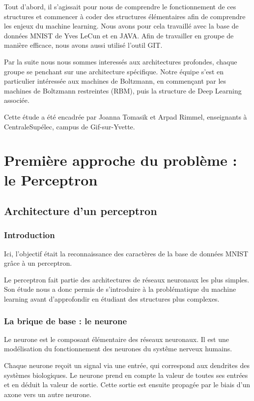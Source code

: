 \documentclass[a4paper,twoside]{report}
\begin{document}
			Tout d'abord, il s'agissait pour nous de comprendre le fonctionnement de ces structures et commencer à coder des structures élémentaires afin de comprendre les enjeux du machine learning. Nous avons pour cela travaillé avec la base de données MNIST de Yves LeCun et en JAVA. Afin de travailler en groupe de manière efficace, nous avons aussi utilisé l'outil GIT.

			Par la suite nous nous sommes interessés aux architectures profondes, chaque groupe se penchant sur une architecture spécifique. Notre équipe s'est en particulier intéressée aux machines de Boltzmann, en commençant par les machines de Boltzmann restreintes (RBM), puis la structure de Deep Learning associée.

			Cette étude a été encadrée par Joanna Tomasik et Arpad Rimmel, enseignants à CentraleSupélec, campus de Gif-sur-Yvette.



	\part[Le Perceptron]{Première approche du problème : le Perceptron}


		\chapter{Architecture d'un perceptron}

			\section{Introduction}

				Ici, l'objectif était la reconnaissance des caractères de la base de données MNIST grâce à un perceptron.

				Le perceptron fait partie des architectures de réseaux neuronaux les plus simples. Son étude nous a donc permis de s'introduire à la problématique du machine learning avant d'approfondir en étudiant des structures plus complexes.


			\section{La brique de base : le neurone}

				Le neurone est le composant élémentaire des réseaux neuronaux. Il est une modélisation du fonctionnement des neurones du systême nerveux humains.

				Chaque neurone reçoit un signal via une entrée, qui correspond aux dendrites des systèmes biologiques. Le neurone prend en compte la valeur de toutes ses entrées et en déduit la valeur de sortie. Cette sortie est ensuite propagée par le biais d'un axone vers un autre neurone.\\
\end{document}
